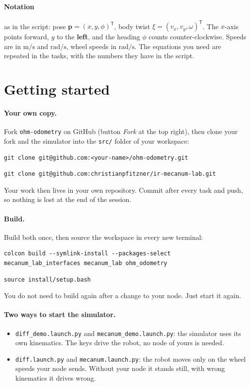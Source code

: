 \documentclass[11pt,a4paper,parskip=half]{scrartcl}
\newcommand{\thema}[1]{\texttt{#1}}
\newcommand{\datei}[1]{\texttt{#1}}
\begin{document}
\paragraph{Notation} as in the script: pose \(\mathbf p = (x, y, \phi)^{\mathsf T}\), body twist
\(\xi = (v_x, v_y, \omega)^{\mathsf T}\). The \(x\)-axis points forward, \(y\) to the \textbf{left}, and the
heading \(\phi\) counts counter-clockwise. Speeds are in \(\mathrm{m/s}\) and \(\mathrm{rad/s}\), wheel
speeds in \(\mathrm{rad/s}\). The equations you need are repeated in the tasks, with the numbers
they have in the script.

\newpage
\section{Getting started}
\paragraph{Your own copy.} Fork \datei{ohm-odometry} on GitHub (button \emph{Fork} at the top right),
then clone your fork and the simulator into the \datei{src/} folder of your workspace:
\begin{lstlisting}
git clone git@github.com:<your-name>/ohm-odometry.git
\end{lstlisting}
\begin{lstlisting}
git clone git@github.com:christianpfitzner/ir-mecanum-lab.git
\end{lstlisting}
Your work then lives in your own repository. Commit after every task and push, so nothing is lost at
the end of the session.

\paragraph{Build.} Build both once, then source the workspace in every new terminal:
\begin{lstlisting}
colcon build --symlink-install --packages-select mecanum_lab_interfaces mecanum_lab ohm_odometry
\end{lstlisting}
\begin{lstlisting}
source install/setup.bash
\end{lstlisting}
You do not need to build again after a change to your node. Just start it again.

\paragraph{Two ways to start the simulator.}
\begin{itemize}
  \item \thema{diff\_demo.launch.py} and \thema{mecanum\_demo.launch.py}: the simulator uses its own
        kinematics. The keys drive the robot, no node of yours is needed.
  \item \thema{diff.launch.py} and \thema{mecanum.launch.py}: the robot moves only on the wheel speeds
        your node sends. Without your node it stands still, with wrong kinematics it drives wrong.
\end{itemize}
\end{document}
